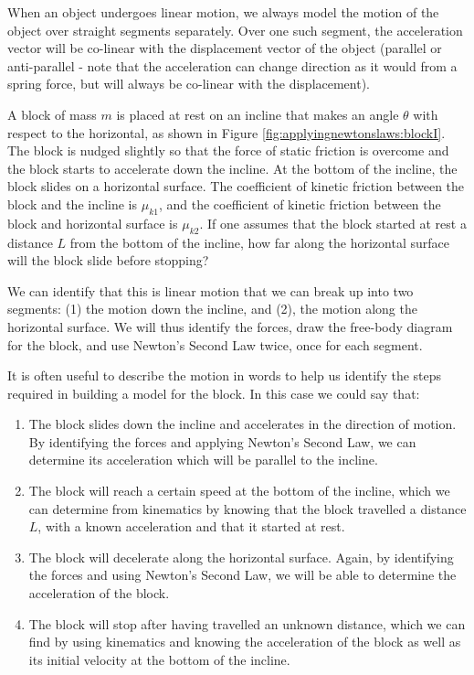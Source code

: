 When an object undergoes linear motion, we always model the motion of the object over straight segments separately. Over one such segment, the acceleration vector will be co-linear with the displacement vector of the object (parallel or anti-parallel - note that the acceleration can change direction as it would from a spring force, but will always be co-linear with the displacement).

\begin{example}{\label{ex:applyingnewtonslaws:block}A block of mass $m$ is placed at rest on an incline that makes an angle $\theta$ with respect to the horizontal, as shown in Figure \ref{fig:applyingnewtonslaws:blockI}. The block is nudged slightly so that the force of static friction is overcome and the block starts to accelerate down the incline. At the bottom of the incline, the block slides on a horizontal surface. The coefficient of kinetic friction between the block and the incline is $\mu_{k1}$, and the coefficient of kinetic friction between the block and horizontal surface is $\mu_{k2}$. If one assumes that the block started at rest a distance $L$ from the bottom of the incline, how far along the horizontal surface will the block slide before stopping?}


We can identify that this is linear motion that we can break up into two segments: (1) the motion down the incline, and (2), the motion along the horizontal surface. We will thus identify the forces, draw the free-body diagram for the block, and use Newton's Second Law twice, once for each segment.

It is often useful to describe the motion in words to help us identify the steps required in building a model for the block. In this case we could say that:
\begin{enumerate}
\item The block slides down the incline and accelerates in the direction of motion. By identifying the forces and applying Newton's Second Law, we can determine its acceleration which will be parallel to the incline.
\item The block will reach a certain speed at the bottom of the incline, which we can determine from kinematics by knowing that the block travelled a distance $L$, with a known acceleration and that it started at rest.
\item The block will decelerate along the horizontal surface. Again, by identifying the forces and using Newton's Second Law, we will be able to determine the acceleration of the block.
\item The block will stop after having travelled an unknown distance, which we can find by using kinematics and knowing the acceleration of the block as well as its initial velocity at the bottom of the incline.
\end{enumerate}


\end{example}
